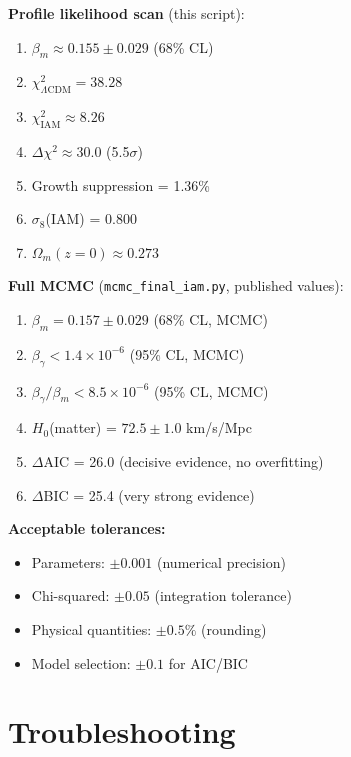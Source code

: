 \documentclass[11pt]{article}
\begin{document}
\noindent\textbf{Profile likelihood scan} (this script):
\begin{enumerate}
    \item[$\square$] $\beta_m \approx 0.155 \pm 0.029$ (68\% CL)
    \item[$\square$] $\chi^2_{\Lambda\text{CDM}} = 38.28$
    \item[$\square$] $\chi^2_{\text{IAM}} \approx 8.26$
    \item[$\square$] $\Delta\chi^2 \approx 30.0$ (5.5$\sigma$)
    \item[$\square$] Growth suppression = 1.36\%
    \item[$\square$] $\sigma_8$(IAM) = 0.800
    \item[$\square$] $\Omega_m(z=0) \approx 0.273$
\end{enumerate}

\noindent\textbf{Full MCMC} (\texttt{mcmc\_final\_iam.py}, published values):
\begin{enumerate}
    \item[$\square$] $\beta_m = 0.157 \pm 0.029$ (68\% CL, MCMC)
    \item[$\square$] $\beta_\gamma < 1.4 \times 10^{-6}$ (95\% CL, MCMC)
    \item[$\square$] $\beta_\gamma/\beta_m < 8.5 \times 10^{-6}$ (95\% CL, MCMC)
    \item[$\square$] $H_0$(matter) = $72.5 \pm 1.0$ km/s/Mpc
    \item[$\square$] $\Delta$AIC = 26.0 (decisive evidence, no overfitting)
    \item[$\square$] $\Delta$BIC = 25.4 (very strong evidence)
\end{enumerate}

\noindent\textbf{Acceptable tolerances:}
\begin{itemize}
    \item Parameters: $\pm 0.001$ (numerical precision)
    \item Chi-squared: $\pm 0.05$ (integration tolerance)
    \item Physical quantities: $\pm 0.5\%$ (rounding)
    \item Model selection: $\pm 0.1$ for AIC/BIC
\end{itemize}

\section{Troubleshooting}
\end{document}
